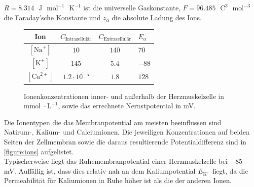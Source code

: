 \documentclass[
	a4paper,			%
	11pt,				%
	headsepline,		%
	bibtotoc,			%
	BCOR18mm,      		%
	DIV14,				%
	headings=normal,
	numbers=noenddot,
]{scrbook}
\theoremstyle{mythmstyle}
\theoremstyle{other}
\begin{document}
	$R = 8.314\text{ } \mathrm{J \text{ } mol}^{-1}\text{ }\mathrm{K}^{-1}$ ist die universelle Gaskonstante,
	 $F = 96.485 \text{ } \mathrm{C^3\text{ } mol ^{-3}}$ die Faraday'sche Konstante und $z_{\alpha}$ die
	 absolute Ladung des Ions.\cite[S.~20-23]{modelling}\\
	 \begin{figure}[h]
		\begin{longtable}{ c | c | c | l  }
			Ion & $C_{\text{Intrazellulär}}$ & $C_{\text{Extrazellulär}}$ & $E_{\alpha}$ \\
			
			\hline 
			$[\mathrm{Na}^+]$ & $10$ & $140$ & $70$\\
			
			$[\mathrm{K}^+]$ & $145$ & $5.4$ & $-88$\\
			$[\mathrm{Ca}^{2+}]$ & $1.2\cdot 10^{-5}$ & $1.8$ & $128$
		\end{longtable}
		\caption{Ionenkonzentrationen inner- und außerhalb der Herzmuskelzelle in
		 $\text{mmol }\cdot \text{L}^{-1}$, sowie das errechnete Nernstpotential in mV. \cite[S.~22]{modelling}}
		\label{figure:ions}
	\end{figure}	
	Die Ionentypen die das Membranpotential am meisten beeinflussen sind Natirum-, Kalium- und Calciumionen.
	Die jeweiligen Konzentrationen auf beiden Seiten der Zellmembran sowie die daraus resultierende
	Potentialdifferenz sind in \autoref{figure:ions} aufgelistet.\\
	Typischerweise liegt das Ruhemembranpotential einer Herzmuskelzelle bei $-85$ mV. Auffällig ist, dass
	dies relativ nah an dem Kaliumpotential $E_{\mathrm{K^+}}$ liegt, da die Permeabilität für Kaliumionen
	in Ruhe höher ist als die der anderen Ionen.
	
\end{document}
